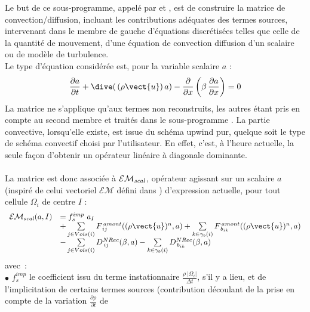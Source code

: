 Le but de ce sous-programme, appel\'e par  et , est de construire la
matrice de convection/diffusion, incluant les contributions ad\'equates des termes sources,
intervenant dans le membre de gauche d'\'equations discr\'etis\'ees telles que
celle de la
quantit\'e de mouvement, d'une \'equation de convection diffusion d'un scalaire
ou de mod\`ele de turbulence.\\
Le type d'\'equation consid\'er\'ee est, pour la variable scalaire $a$ :
\begin{equation}\notag
\displaystyle \frac{\partial a}{\partial t} + \dive (\,(\rho \vect{u})\, a) -
\displaystyle \frac{\partial }{\partial x}\left(\beta\,\frac{\partial a}{\partial x}\right) = 0
\end{equation}
La matrice ne s'applique qu'aux termes non reconstruits, les autres \'etant pris en compte au second membre et
trait\'es dans le sous-programme . La partie
convective, lorsqu'elle existe, est issue du sch\'ema upwind pur, quelque soit
le type de sch\'ema convectif choisi par l'utilisateur. En effet, c'est, \`a
l'heure actuelle, la seule fa\c con d'obtenir un op\'erateur lin\'eaire à
diagonale dominante.\\\\
La matrice est donc associ\'ee \`a $\mathcal{EM_{\it{scal}}}$, op\'erateur
agissant sur un scalaire $a$ (inspir\'e de celui vectoriel $\mathcal{EM}$
d\'efini dans ) d'expression actuelle, pour tout cellule $\Omega_i$ de
centre $I$  :
\begin{equation}\notag
\begin{array}{lll}
\mathcal{EM_{\it{scal}}}(a,I) &=  f_s^{imp}\ a_I\ \\
&+\sum\limits_{j\in Vois(i)}{F^{\,amont}_{\,ij}((\rho\vect{u})^n,a)}
+\sum\limits_{k\in {\gamma_b(i)}} {F^{\,amont}_{\,{b}_{ik}}((\rho
\vect{u})^n,a)}\\
&-\sum\limits_{j\in Vois(i)}{D^{NRec}_{\,ij}(\beta,a)}
-\sum\limits_{k\in {\gamma_b(i)}} {D^{NRec}_{\,{b}_{ik}}(\beta,a)}\\
\end{array}
\end{equation}
avec~:\\
$\bullet$ $f_s^{imp}$ le coefficient issu du terme instationnaire
$\displaystyle\frac{\rho \ |\Omega_i|}{\Delta t}$, s'il y a lieu, et de
l'implicitation de certains termes sources (contribution d\'ecoulant de la prise
en compte de la
variation $\displaystyle\frac{\partial \rho }{\partial t}$ de
